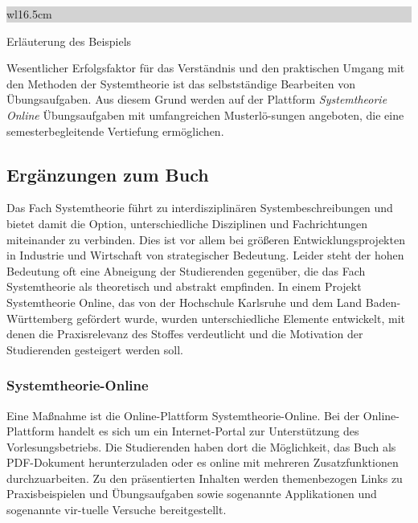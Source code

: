 \noindent
\colorbox{lightgray}{%
%
\renewcommand\arraystretch{0.6}%
\begin{tabular}{ wl{16.5cm} }
{\selectfont
{}}
\end{tabular}%
}\medskip

\noindent Erläuterung des Beispiels \medskip

\noindent Wesentlicher Erfolgsfaktor für das Verständnis und den praktischen Umgang mit den Methoden der Systemtheorie ist das selbstständige Bearbeiten von Übungsaufgaben. Aus diesem Grund werden auf der Plattform \textit{Systemtheorie Online} Übungsaufgaben mit umfangreichen Musterlö-sungen angeboten, die eine semesterbegleitende Vertiefung ermöglichen. 




\subsection{Ergänzungen zum Buch}

Das Fach Systemtheorie führt zu interdisziplinären Systembeschreibungen und bietet damit die Option, unterschiedliche Disziplinen und Fachrichtungen miteinander zu verbinden. Dies ist vor allem bei größeren Entwicklungsprojekten in Industrie und Wirtschaft von strategischer Bedeutung. Leider steht der hohen Bedeutung oft eine Abneigung der Studierenden gegenüber, die das Fach Systemtheorie als theoretisch und abstrakt empfinden. In einem Projekt Systemtheorie Online, das von der Hochschule Karlsruhe und dem Land Baden-Württemberg gefördert wurde, wurden unterschiedliche Elemente entwickelt, mit denen die Praxisrelevanz des Stoffes verdeutlicht und die Motivation der Studierenden gesteigert werden soll. 

\subsubsection{Systemtheorie-Online}

Eine Maßnahme ist die Online-Plattform Systemtheorie-Online. Bei der Online-Plattform handelt es sich um ein Internet-Portal zur Unterstützung des Vorlesungsbetriebs. Die Studierenden haben dort die Möglichkeit, das Buch als PDF-Dokument herunterzuladen oder es online mit mehreren Zusatzfunktionen durchzuarbeiten. Zu den präsentierten Inhalten werden themenbezogen Links zu Praxisbeispielen und Übungsaufgaben sowie sogenannte Applikationen und sogenannte vir-tuelle Versuche bereitgestellt.

